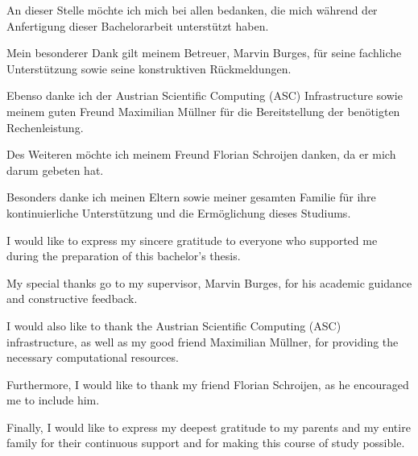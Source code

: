 \documentclass[final,twoside]{vutinfth}
\begin{document}
\raggedbottom%

\frontmatter %


\begin{danksagung*}
An dieser Stelle möchte ich mich bei allen bedanken, die mich während der Anfertigung dieser Bachelorarbeit unterstützt haben.

Mein besonderer Dank gilt meinem Betreuer, Marvin Burges, für seine fachliche Unterstützung sowie seine konstruktiven Rückmeldungen.

Ebenso danke ich der Austrian Scientific Computing (ASC) Infrastructure sowie meinem guten Freund Maximilian Müllner für die Bereitstellung der benötigten Rechenleistung.

Des Weiteren möchte ich meinem Freund Florian Schroijen danken, da er mich darum gebeten hat.

Besonders danke ich meinen Eltern sowie meiner gesamten Familie für ihre kontinuierliche Unterstützung und die Ermöglichung dieses Studiums.
\end{danksagung*}

\begin{acknowledgements*}
I would like to express my sincere gratitude to everyone who supported me during the preparation of this bachelor’s thesis.

My special thanks go to my supervisor, Marvin Burges, for his academic guidance and constructive feedback.

I would also like to thank the Austrian Scientific Computing (ASC) infrastructure, as well as my good friend Maximilian Müllner, for providing the necessary computational resources.

Furthermore, I would like to thank my friend Florian Schroijen, as he encouraged me to include him.

Finally, I would like to express my deepest gratitude to my parents and my entire family for their continuous support and for making this course of study possible.
\end{acknowledgements*}
\end{document}
